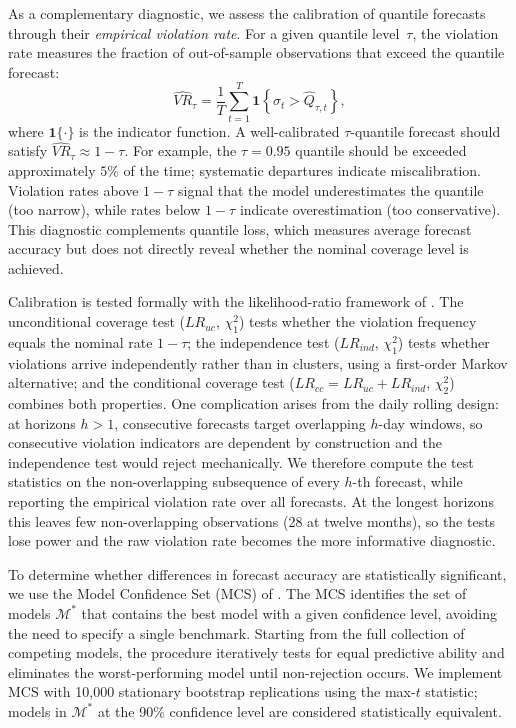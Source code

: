 As a complementary diagnostic, we assess the calibration of quantile
forecasts through their \emph{empirical violation rate}. For a given
quantile level~$\tau$, the violation rate measures the fraction of
out-of-sample observations that exceed the quantile forecast:
\begin{equation}
\label{eq:violation-rate}
\widehat{VR}_{\tau} = \frac{1}{T}\sum_{t=1}^{T} \mathbf{1}\!\left\{\sigma_t > \hat{Q}_{\tau,t}\right\},
\end{equation}
where $\mathbf{1}\{\cdot\}$ is the indicator function. A well-calibrated
$\tau$-quantile forecast should satisfy $\widehat{VR}_{\tau} \approx 1 - \tau$.
For example, the $\tau = 0.95$ quantile should be exceeded approximately
$5\%$ of the time; systematic departures indicate miscalibration. Violation
rates above $1 - \tau$ signal that the model underestimates the quantile
(too narrow), while rates below $1 - \tau$ indicate overestimation
(too conservative). This diagnostic complements quantile loss, which
measures average forecast accuracy but does not directly reveal whether
the nominal coverage level is achieved.

Calibration is tested formally with the likelihood-ratio framework of
\textcite{christoffersen1998evaluating}. The unconditional coverage test
($LR_{uc}$, $\chi^2_1$) tests whether the violation frequency equals the
nominal rate $1 - \tau$; the independence test ($LR_{ind}$, $\chi^2_1$)
tests whether violations arrive independently rather than in clusters,
using a first-order Markov alternative; and the conditional coverage test
($LR_{cc} = LR_{uc} + LR_{ind}$, $\chi^2_2$) combines both properties.
One complication arises from the daily rolling design: at horizons
$h > 1$, consecutive forecasts target overlapping $h$-day windows, so
consecutive violation indicators are dependent by construction and the
independence test would reject mechanically. We therefore compute the
test statistics on the non-overlapping subsequence of every $h$-th
forecast, while reporting the empirical violation rate over all
forecasts. At the longest horizons this leaves few non-overlapping
observations (28 at twelve months), so the tests lose power and the raw
violation rate becomes the more informative diagnostic.

To determine whether differences in forecast accuracy are statistically
significant, we use the Model Confidence Set (MCS) of
\textcite{hansen2011model}. The MCS identifies the set of models
$\mathcal{M}^*$ that contains the best model with a given confidence level,
avoiding the need to specify a single benchmark. Starting from the full
collection of competing models, the procedure iteratively tests for equal
predictive ability and eliminates the worst-performing model until
non-rejection occurs. We implement MCS with 10,000 stationary bootstrap
replications using the max-$t$ statistic; models in $\mathcal{M}^*$ at
the 90\% confidence level are considered statistically equivalent.

